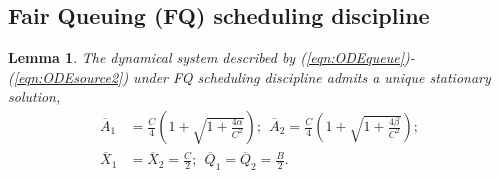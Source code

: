 \documentclass[a4paper,oneside, 11pt]{article}
\newtheorem{lem}[theorem]{Lemma}
\begin{document}
\subsection{Fair Queuing (FQ) scheduling discipline}\label{sec:FQ}
\begin{lem}
 The dynamical system described by (\ref{eqn:ODEqueue})-(\ref{eqn:ODEsource2}) under FQ scheduling discipline admits a unique stationary solution,
\begin{align*}
\overline{A}_1&=\frac{C}{4}\left(1+\sqrt{1+\frac{4\alpha}{C^2}}\right);
~~\overline{A}_2=\frac{C}{4}\left(1+\sqrt{1+\frac{4\beta}{C^2}}\right); \nonumber \\
\overline{X}_1&=\overline{X}_2=\frac{C}{2};
~~\overline{Q}_1=\overline{Q}_2=\frac{B}{2}.
\end{align*}
\end{lem}
\end{document}
